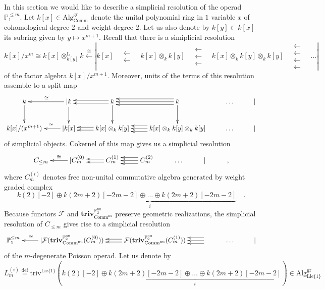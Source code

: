 \documentclass[10pt, oneside]{amsart}
\theoremstyle{plain}
\newcommand{\alg}{\mathrm{Alg}}
\newcommand{\comm}{\mathrm{Comm}}
\newcommand{\define}{\text{def}}
\newcommand{\F}{\mathcal{F}}
\newcommand{\gr}{\mathrm{gr}}
\newcommand{\lie}{\mathrm{Lie}}
\renewcommand{\nu}{\mathrm{nu}}
\newcommand{\PP}{\mathbb{P}}
\newcommand{\triv}{\mathrm{triv}}
\newcommand{\Triv}{\mathbf{triv}}
\begin{document}
In this section we would like to describe a simplicial resolution of the operad $\PP_1^{\le m}$. Let $k[x] \in \alg_\comm^\gr$
denote the unital polynomial ring in $1$ variable $x$ of cohomological degree $2$ and weight degree $2$. Let us also denote by
$k[y] \subset k[x]$ its subring given by $y \mapsto x^{m+1}$. Recall that there is a simiplicial resolution
\begin{equation*}
k[x]/x^m \cong k[x] \otimes^\mathrm{L}_{k[y]} k \stackrel{\cong}{\longleftarrow} | k[x] \quad\substack{\longleftarrow \\ \longleftarrow}\quad k[x]\otimes_k k[y] \quad\substack{\longleftarrow \\ \longleftarrow \\ \longleftarrow}\quad k[x]\otimes_k k[y]\otimes_k k[y] \quad\substack{\longleftarrow \\ \longleftarrow \\ \longleftarrow \\ \longleftarrow}\quad \ldots |
\end{equation*}
of the factor algebra $k[x] / x^{m+1}$. Moreover, units of the terms of this resolution assemble to a split map
\[\xymatrix{
k\ar[d] & | k\ar[d] \ar[l]_\cong & k\ar[d] \ar@<0.5ex>[l] \ar@<-0.5ex>[l] & k\ar[d] \ar[l]\ar@<1ex>[l]\ar@<-1ex>[l] & \ldots &| \\
k[x]/(x^{m+1}) & | k[x] \ar[l]_(0.4)\cong & k[x]\otimes_k k[y] \ar@<0.5ex>[l]\ar@<-0.5ex>[l] & k[x]\otimes_kk[y]\otimes_kk[y] \ar[l]\ar@<1ex>[l]\ar@<-1ex>[l] & \ldots &|
}\]
of simplicial objects. Cokernel of this map gives us a simplicial resolution
\[\xymatrix{
C_{\le m} & | C_m^{(0)} \ar[l]_\cong & C^{(1)}_m \ar@<0.5ex>[l]\ar@<-0.5ex>[l] & C^{(2)}_m \ar[l]\ar@<1ex>[l]\ar@<-1ex>[l] & \ldots &| &,
}\]
where $C_m^{(i)}$ denotes free non-unital commutative algebra generated by weight graded complex
\begin{equation}\label{model-generating-complex}
k(2)[-2] \oplus \underbrace{k(2m+2)[-2m-2] \oplus \ldots \oplus k(2m+2)[-2m-2]}_i \quad.
\end{equation}
Because functors $\F$ and $\Triv^{\PP^\nu_2}_{\comm^\nu}$ preserve geometric realizations, the simplicial resolution of $C_{\le m}$
gives rise to a simplicial resolution
\[\xymatrix{
\PP_1^{\le m} & | \F ( \Triv^{\PP^\nu_2}_{\comm^\nu} ( C_m^{(0)} )) \ar[l]_(0.7)\cong & \F ( \Triv^{\PP^\nu_2}_{\comm^\nu} ( C^{(1)}_m )) \ar@<0.5ex>[l]\ar@<-0.5ex>[l] & \ar[l]\ar@<1ex>[l]\ar@<-1ex>[l] & \ldots &|
}\]
of the $m$-degenerate Poisson operad. Let us denote by
\begin{equation*}
L_m^{(i)} \stackrel{\define}{=} \triv^{\lie\{1\}} (k(2)[-2] \oplus \underbrace{k(2m+2)[-2m-2] \oplus \ldots \oplus k(2m+2)[-2m-2]}_i) \in \alg^\gr_{\lie\{1\}}
\end{equation*}
\end{document}
